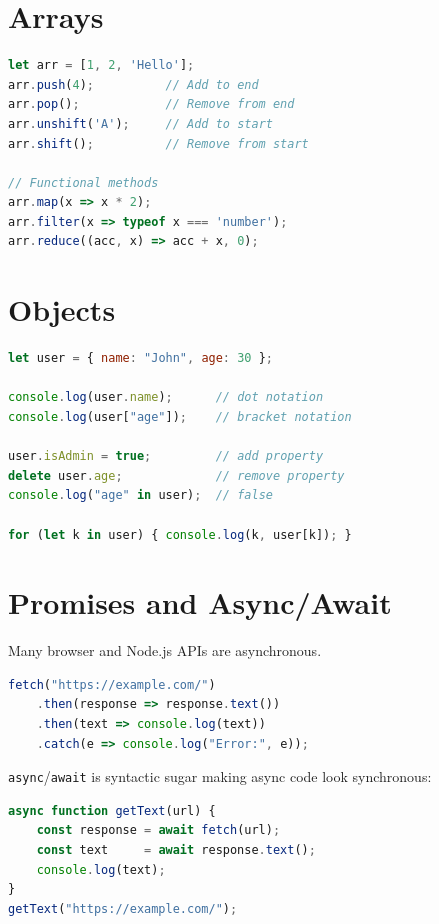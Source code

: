 \documentclass[12pt,a4paper,openany]{book}
\theoremstyle{definition}
\theoremstyle{plain}
\theoremstyle{remark}
\begin{document}
\section{Arrays}

\begin{lstlisting}[language=JavaScript,caption=Array operations]
let arr = [1, 2, 'Hello'];
arr.push(4);          // Add to end
arr.pop();            // Remove from end
arr.unshift('A');     // Add to start
arr.shift();          // Remove from start

// Functional methods
arr.map(x => x * 2);
arr.filter(x => typeof x === 'number');
arr.reduce((acc, x) => acc + x, 0);
\end{lstlisting}

\section{Objects}

\begin{lstlisting}[language=JavaScript,caption=Objects]
let user = { name: "John", age: 30 };

console.log(user.name);      // dot notation
console.log(user["age"]);    // bracket notation

user.isAdmin = true;         // add property
delete user.age;             // remove property
console.log("age" in user);  // false

for (let k in user) { console.log(k, user[k]); }
\end{lstlisting}

\section{Promises and Async/Await}

Many browser and Node.js APIs are asynchronous.

\begin{lstlisting}[language=JavaScript,caption=Promise chain]
fetch("https://example.com/")
    .then(response => response.text())
    .then(text => console.log(text))
    .catch(e => console.log("Error:", e));
\end{lstlisting}

\texttt{async}/\texttt{await} is syntactic sugar making async code look
synchronous:

\begin{lstlisting}[language=JavaScript,caption=async/await]
async function getText(url) {
    const response = await fetch(url);
    const text     = await response.text();
    console.log(text);
}
getText("https://example.com/");
\end{lstlisting}
\end{document}
